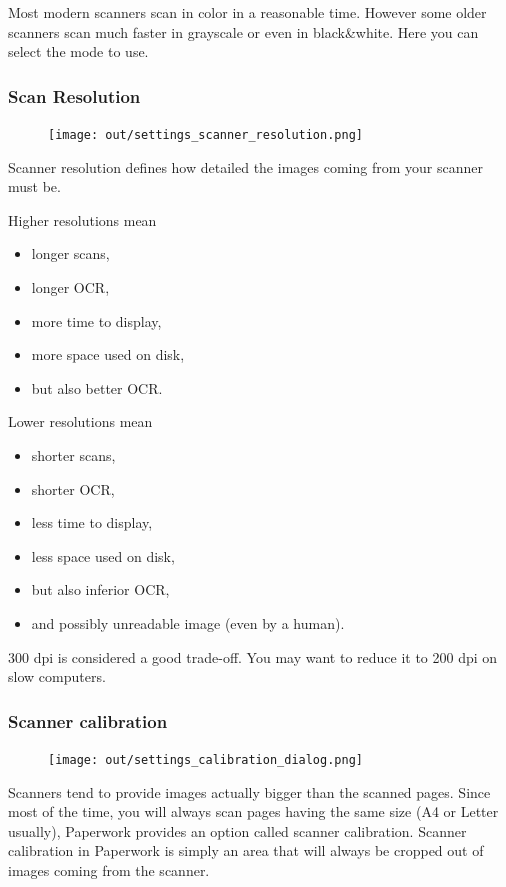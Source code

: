 \documentclass[10pt,a4paper]{article}
\begin{document}
Most modern scanners scan in color in a reasonable time. However some older
scanners scan much faster in grayscale or even in black\&white. Here you can
select the mode to use.


\subsubsection{Scan Resolution}

\begin{figure}[H]
	\texttt{[image: out/settings\_scanner\_resolution.png]}
\end{figure}

Scanner resolution defines how detailed the images coming from your
scanner must be.

Higher resolutions mean
\begin{itemize}
	\item longer scans,
	\item longer OCR,
	\item more time to display,
	\item more space used on disk,
	\item but also better OCR.
\end{itemize}

Lower resolutions mean
\begin{itemize}
	\item shorter scans,
	\item shorter OCR,
	\item less time to display,
	\item less space used on disk,
	\item but also inferior OCR,
	\item and possibly unreadable image (even by a human).
\end{itemize}

300 dpi is considered a good trade-off. You may want to reduce it
to 200 dpi on slow computers.


\subsubsection{Scanner calibration}

\begin{figure}[H]
	\texttt{[image: out/settings\_calibration\_dialog.png]}
\end{figure}

Scanners tend to provide images actually bigger than the scanned pages.
Since most of the time, you will always scan pages having the same
size (A4 or Letter usually), Paperwork provides an option called scanner
calibration. Scanner calibration in Paperwork is simply an area that will
always be cropped out of images coming from the scanner.
\end{document}
